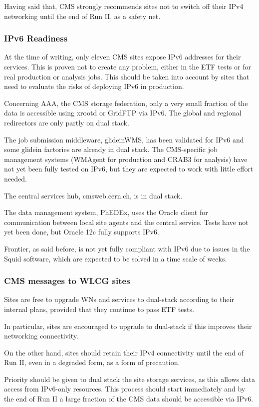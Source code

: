 Having said that, CMS strongly recommends sites not to switch off their IPv4 networking until the end of Run II, as a safety net.

\subsubsection{IPv6 Readiness}
At the time of writing, only eleven CMS sites expose IPv6 addresses
for their services. This is proven not to create any problem, either
in the ETF tests or for real production or analysis jobs. This should
be taken into account by sites that need to evaluate the risks of
deploying IPv6 in production.

Concerning AAA, the CMS storage federation, only a very small fraction
of the data is accessible using xrootd or GridFTP via IPv6. The global
and regional redirectors are only partly on dual stack.

The job submission middleware, glideinWMS, has been validated for IPv6
and some glidein factories are already in dual stack. The CMS-specific
job management systems (WMAgent for production and CRAB3 for analysis)
have not yet been fully tested on IPv6, but they are expected to work
with little effort needed.

The central services hub, cmsweb.cern.ch, is in dual stack.

The data management system, PhEDEx, uses the Oracle client for
communication between local site agents and the central service. Tests
have not yet been done, but Oracle 12c fully supports IPv6.

Frontier, as said before, is not yet fully compliant with IPv6 due to
issues in the Squid software, which are expected to be solved in a
time scale of weeks.

\subsubsection{CMS messages to WLCG sites}
Sites are free to upgrade WNs and services to dual-stack according to
their internal plans, provided that they continue to pass ETF tests.

In particular, sites are encouraged to upgrade to dual-stack if this
improves their networking connectivity.

On the other hand, sites should retain their IPv4 connectivity until
the end of Run II, even in a degraded form, as a form of precaution.

Priority should be given to dual stack the site storage services, as
this allows data access from IPv6-only resources. This process should
start immediately and by the end of Run II a large fraction of the CMS
data should be accessible via IPv6.

